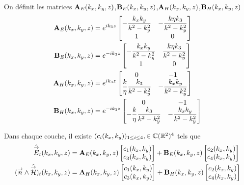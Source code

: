         \begin{defn}
            On définit les matrices \(\mathbf{A}_{E}(k_x,k_y,z)\),\(\mathbf{B}_{E}(k_x,k_y,z)\),\(\mathbf{A}_{H}(k_x,k_y,z)\),\(\mathbf{B}_{H}(k_x,k_y,z)\)
            \begin{align}
              \mathbf{A}_{E}(k_x,k_y,z) &= e^{ik_3z}
              \begin{bmatrix}
                -\dfrac{k_xk_y}{k^2 - k_y^2} & -\dfrac{k\eta k_3}{k^2 - k_y^2}
                \\
                1 & 0
              \end{bmatrix}
              \\
              \mathbf{B}_{E}(k_x,k_y,z) &= e^{-ik_3z}
              \begin{bmatrix}
                -\dfrac{k_xk_y}{k^2 - k_y^2} & \dfrac{k\eta k_3}{k^2 - k_y^2}
                \\
                1 & 0
              \end{bmatrix}
              \\
              \mathbf{A}_{H}(k_x,k_y,z) &= e^{ik_3z}
              \begin{bmatrix}
                0 & -1
                \\
                \dfrac{k}{\eta}\dfrac{k_3}{k^2 - k_y^2} & -\dfrac{k_xk_y}{k^2 - k_y^2}
              \end{bmatrix}
              \\
              \mathbf{B}_{H}(k_x,k_y,z) &= e^{-ik_3z}
              \begin{bmatrix}
                0 & -1
                \\
                -\dfrac{k}{\eta}\dfrac{k_3}{k^2 - k_y^2} & -\dfrac{k_xk_y}{k^2 - k_y^2}
              \end{bmatrix}
            \end{align}
        \end{defn}

        \begin{prop}
            Dans chaque couche, il existe \((c_i(k_x,k_y))_{1\le i \le4}, \in \mathbb C(\mathbb R^2)^4\) tels que
            \begin{align}
                \hat{{\overset{\rightarrow}{E}}}_t(k_x,k_y,z) &= \mathbf{A}_E(k_x,k_y,z) \begin{bmatrix}c_1(k_x,k_y) \\ c_3(k_x,k_y)\end{bmatrix} + \mathbf{B}_E(k_x,k_y,z) \begin{bmatrix}c_2(k_x,k_y) \\ c_4(k_x,k_y)\end{bmatrix}
                \\
                ({\overset{\rightarrow}{n}} \wedge \hat{{\overset{\rightarrow}{\mathcal{H}}}})_t(k_x,k_y,z) &= \mathbf{A}_H(k_x,k_y,z) \begin{bmatrix}c_1(k_x,k_y) \\ c_3(k_x,k_y)\end{bmatrix} + \mathbf{B}_H(k_x,k_y,z) \begin{bmatrix}c_2(k_x,k_y) \\ c_4(k_x,k_y)\end{bmatrix}
            \end{align}
        \end{prop}

